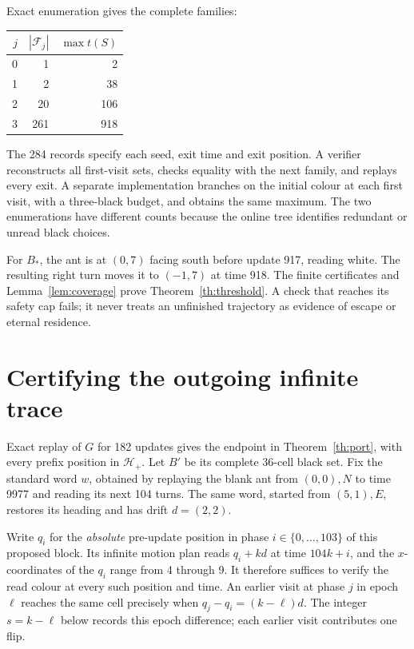 \documentclass[11pt]{article}
\newcommand{\HH}{\mathcal H}
\begin{document}
Exact enumeration gives the complete families:
\begin{center}
\begin{tabular}{rrr}
\toprule
$j$ & $|\mathcal F_j|$ & $\max t(S)$\\
\midrule
0 & 1 & 2\\
1 & 2 & 38\\
2 & 20 & 106\\
3 & 261 & 918\\
\bottomrule
\end{tabular}
\end{center}
The 284 records specify each seed, exit time and exit position. A verifier
reconstructs all first-visit sets, checks equality with the next family,
and replays every exit. A separate implementation branches on the initial
colour at each first visit, with a three-black budget, and obtains the same
maximum. The two enumerations have different counts because the online tree
identifies redundant or unread black choices.

For $B_*$, the ant is at $(0,7)$ facing south before update 917, reading
white. The resulting right turn moves it to $(-1,7)$ at time 918. The finite
certificates and Lemma~\ref{lem:coverage} prove Theorem~\ref{th:threshold}.
A check that reaches its safety cap fails; it never treats an unfinished
trajectory as evidence of escape or eternal residence.

\section{Certifying the outgoing infinite trace}
Exact replay of $G$ for 182 updates gives the endpoint in
Theorem~\ref{th:port}, with every prefix position in $\HH_+$. Let $B'$ be
its complete 36-cell black set. Fix the standard word $w$, obtained by
replaying the blank ant from $(0,0),N$ to time 9977 and reading its next
104 turns. The same word, started from $(5,1),E$, restores its heading and
has drift $d=(2,2)$.

Write $q_i$ for the \emph{absolute} pre-update position in phase
$i\in\{0,\ldots,103\}$ of this proposed block. Its infinite motion plan
reads $q_i+kd$ at time $104k+i$, and the $x$-coordinates of the $q_i$ range
from 4 through 9. It therefore suffices to verify the read colour at every
such position and time. An earlier visit at phase $j$ in epoch $\ell$ reaches
the same cell precisely when $q_j-q_i=(k-\ell)d$. The integer $s=k-\ell$
below records this epoch difference; each earlier visit contributes one flip.
\end{document}
